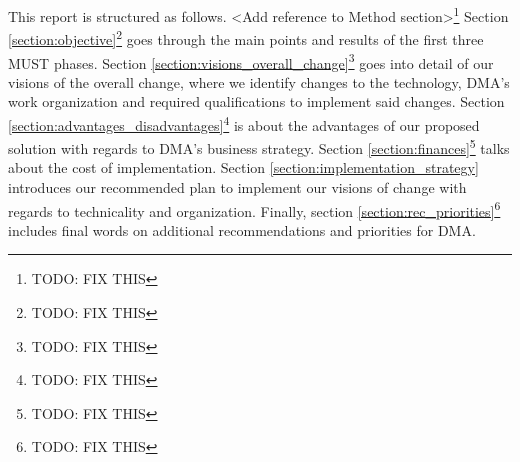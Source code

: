 This report is structured as follows. <Add reference to Method section>\footnote{TODO: FIX THIS} Section \ref{section:objective}\footnote{TODO: FIX THIS} goes through the main points and results of the first three MUST phases. Section \ref{section:visions_overall_change}\footnote{TODO: FIX THIS} goes into detail of our visions of the overall change, where we identify changes to the technology, DMA’s work organization and required qualifications to implement said changes. Section \ref{section:advantages_disadvantages}\footnote{TODO: FIX THIS} is about the advantages of our proposed solution with regards to DMA’s business strategy. Section \ref{section:finances}\footnote{TODO: FIX THIS} talks about the cost of implementation. Section \ref{section:implementation_strategy} introduces our recommended plan to implement our visions of change with regards to technicality and organization. Finally, section \ref{section:rec_priorities}\footnote{TODO: FIX THIS} includes final words on additional recommendations and priorities for DMA.

